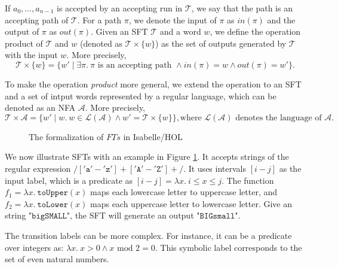 \documentclass[a4paper,UKenglish,cleveref, autoref, thm-restate]{lipics-v2021}
\begin{document}
If $a_0,\ldots,a_{n-1}$ is accepted by an accepting run in $\mathcal{T}$, we say that the path is an accepting path of $\mathcal{T}$.
For a path $\pi$, we denote the input of $\pi$ as $in(\pi)$ and the output of $\pi$ as $out(\pi)$.
%
Given an SFT $\mathcal{T}$ and a word $w$, we define the operation product of $\mathcal{T}$ and $w$ (denoted as $\mathcal{T}\times\{w\}$) as the set of outputs generated by $\mathcal{T}$ with the input $w$. More precisely, 
\[
\mathcal{T}\times\{w\} = \{w'\mid \exists \pi.~\pi \text{ is an accepting path }\land in(\pi) = w \land out(\pi) = w'\}.
\]

To make the operation \emph{product} more general, we extend the operation to an SFT and a set of intput words represented by a regular language, which can be denoted as an NFA $\mathcal{A}$. More precisely,
\[
\mathcal{T}\times \mathcal{A} = \{w'\mid w.~w\in \mathcal{L}(\mathcal{A})\land w' = \mathcal{T}\times\{w\} \}, \text{where $\mathcal{L}(\mathcal{A})$ denotes the language of $\mathcal{A}$}.
\] 

\begin{figure}[hbt!]
  \centering
    \caption{The formalization of $FTs$ in Isabelle/HOL}
    \label{fig-example-ft}
    \end{figure}   
We now illustrate SFTs with an example in Figure \ref{fig-example-ft}. It accepts strings of the regular expression $/['\texttt{a}'-'\texttt{z}']+['\texttt{A}'-'\texttt{Z}']+/$. 
It uses intervals $[i-j]$ as the input label, which is a predicate as $[i-j] = \lambda x.~ i \leq x \leq j$.
The function $f_1=\lambda x.~ \texttt{toUpper}(x)$ maps each lowercase letter to uppercase letter, and $f_2=\lambda x.~\texttt{toLower}(x)$ maps each uppercase letter to lowercase letter.
Give an string "$\texttt{bigSMALL}$", the SFT will generate an output "$\texttt{BIGsmall}$". 

The transition labels can be more complex. For instance, it can be a predicate over integers as: $\lambda x.~ x >0 \land x \text{ mod } 2 = 0$. This symbolic label corresponds to the set of even natural numbers.
\end{document}
